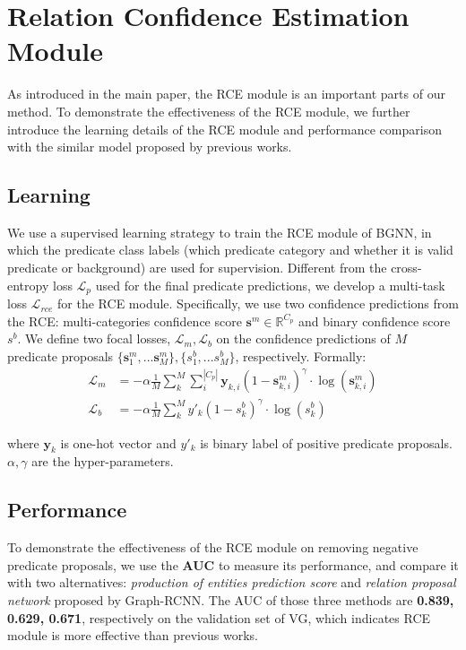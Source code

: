 \section{Relation Confidence Estimation Module}
As introduced in the main paper, the RCE module is an important parts of our method.
To demonstrate the effectiveness of the RCE module, we further introduce the learning details of the RCE module and performance comparison with the similar model proposed by previous works.

\subsection{Learning}
We use a supervised learning strategy to train the RCE module of BGNN, in which the predicate class labels (which predicate category and whether it is valid predicate or background) are used for supervision. 
Different from the cross-entropy loss $\mathcal{L}_p$ used for the final predicate predictions, we develop a multi-task loss $\mathcal{L}_{rce}$ for the RCE module. Specifically, we use two confidence predictions from the RCE: multi-categories confidence score $\mathbf{s}^m \in \mathbb{R}^{C_p}$ and binary confidence score $s^b$. We define two focal losses, $\mathcal{L}_{m},  \mathcal{L}_{b}$ on the confidence predictions of $M$ predicate proposals $\{\mathbf{s}^m_1, ... \mathbf{s}^m_M\}, \{s^b_1, ... s^b_M\}$, respectively. 
Formally:
\begin{align}
\mathcal{L}_{m} &= -\alpha\frac{1}{M}\sum_k^{M}\sum_i^{|C_{p}|} \mathbf{y}_{k, i} (1- \mathbf{s}^m_{k,i})^{\gamma} \cdot \log(\mathbf{s}^m_{k,i}) \\
\mathcal{L}_{b} &= -\alpha\frac{1}{M}\sum_k^{M} y'_k(1- s^b_{k})^{\gamma} \cdot \log(s^b_{k})
\end{align}

where $\mathbf{y}_{k}$ is one-hot vector and $y'_k$ is binary label of positive predicate proposals. $\alpha,\gamma$ are the hyper-parameters.


\subsection{Performance}
To demonstrate the effectiveness of the RCE module on removing negative predicate proposals, we use the \textbf{AUC} to measure its performance, and compare it with two alternatives: \textit{production of entities prediction score} and \textit{relation proposal network} proposed by Graph-RCNN.
The AUC of those three methods are \textbf{0.839, 0.629, 0.671}, respectively on the validation set of VG, which indicates RCE module is more effective than previous works.


